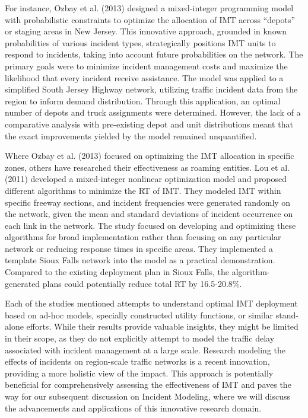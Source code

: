 \documentclass[fancy, oneside, mastersfancy, ms]{byuthesis}
\begin{document}
For instance, Ozbay et al. (2013) designed a mixed-integer programming
model with probabilistic constraints to optimize the allocation of IMT
across ``depots'' or staging areas in New Jersey. This innovative
approach, grounded in known probabilities of various incident types,
strategically positions IMT units to respond to incidents, taking into
account future probabilities on the network. The primary goals were to
minimize incident management costs and maximize the likelihood that
every incident receive assistance. The model was applied to a simplified
South Jersey Highway network, utilizing traffic incident data from the
region to inform demand distribution. Through this application, an
optimal number of depots and truck assignments were determined. However,
the lack of a comparative analysis with pre-existing depot and unit
distributions meant that the exact improvements yielded by the model
remained unquantified.

Where Ozbay et al. (2013) focused on optimizing the IMT allocation in
specific zones, others have researched their effectiveness as roaming
entities. Lou et al. (2011) developed a mixed-integer nonlinear
optimization model and proposed different algorithms to minimize the RT
of IMT. They modeled IMT within specific freeway sections, and incident
frequencies were generated randomly on the network, given the mean and
standard deviations of incident occurrence on each link in the network.
The study focused on developing and optimizing these algorithms for
broad implementation rather than focusing on any particular network or
reducing response times in specific areas. They implemented a template
Sioux Falls network into the model as a practical demonstration.
Compared to the existing deployment plan in Sioux Falls, the
algorithm-generated plans could potentially reduce total RT by
16.5-20.8\%.

Each of the studies mentioned attempts to understand optimal IMT
deployment based on ad-hoc models, specially constructed utility
functions, or similar stand-alone efforts. While their results provide
valuable insights, they might be limited in their scope, as they do not
explicitly attempt to model the traffic delay associated with incident
management at a large scale. Research modeling the effects of incidents
on region-scale traffic networks is a recent innovation, providing a
more holistic view of the impact. This approach is potentially
beneficial for comprehensively assessing the effectiveness of IMT and
paves the way for our subsequent discussion on Incident Modeling, where
we will discuss the advancements and applications of this innovative
research domain.
\end{document}
